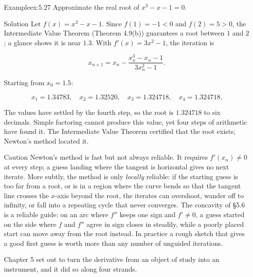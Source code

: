 \documentclass[a4paper,12pt,oneside]{memoir}
\begin{document}
\begin{workedexample}
\begin{envexample}{Example}{ex:5.27}{}
Approximate the real root of \(x^{3} - x - 1 = 0\).
\end{envexample}
\begin{envsolution}{Solution}{}{}
Let \(f(x) = x^{3} - x - 1\). Since \(f(1) = -1 < 0\) and \(f(2) = 5 > 0\), the Intermediate Value Theorem (Theorem 4.9(b)) guarantees a root between \(1\) and \(2\); a glance shows it is near \(1.3\). With \(f'(x) = 3x^{2} - 1\), the iteration is

\[ x_{n+1} = x_{n} - \frac{x_{n}^{3} - x_{n} - 1}{3x_{n}^{2} - 1}. \]

Starting from \(x_{0} = 1.5\):

\[ x_{1} = 1.34783, \quad x_{2} = 1.32520, \quad x_{3} = 1.324718, \quad x_{4} = 1.324718. \]

The values have settled by the fourth step, so the root is \(1.324718\) to six decimals. Simple factoring cannot produce this value, yet four steps of arithmetic have found it. The Intermediate Value Theorem certified that the root exists; Newton’s method located it. \qedmark
\end{envsolution}
\end{workedexample}
\begin{envcaution}{Caution}{}{}
Newton’s method is fast but not always reliable. It requires \(f'(x_{n}) \ne 0\) at every step; a guess landing where the tangent is horizontal gives no next iterate. More subtly, the method is only \emph{locally} reliable: if the starting guess is too far from a root, or is in a region where the curve bends so that the tangent line crosses the \(x\)-axis beyond the root, the iterates can overshoot, wander off to infinity, or fall into a repeating cycle that never converges. The concavity of §5.6 is a reliable guide: on an arc where \(f''\) keeps one sign and \(f' \ne 0\), a guess started on the side where \(f\) and \(f''\) agree in sign closes in steadily, while a poorly placed start can move away from the root instead. In practice a rough sketch that gives a good first guess is worth more than any number of unguided iterations.
\end{envcaution}
Chapter 5 set out to turn the derivative from an object of study into an instrument, and it did so along four strands.
\end{document}
